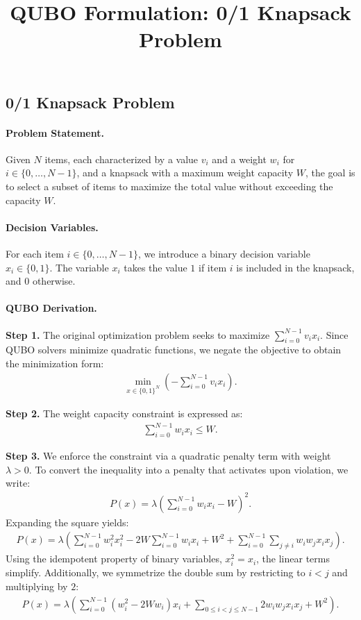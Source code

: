 \documentclass[12pt]{article}
\title{QUBO Formulation: 0/1 Knapsack Problem}
\date{}
\begin{document}
\maketitle

\subsection*{0/1 Knapsack Problem}

\paragraph{Problem Statement.}
Given $N$ items, each characterized by a value $v_i$ and a weight $w_i$ for $i \in \{0, \dots, N-1\}$, and a knapsack with a maximum weight capacity $W$, the goal is to select a subset of items to maximize the total value without exceeding the capacity $W$.

\paragraph{Decision Variables.}
For each item $i \in \{0, \dots, N-1\}$, we introduce a binary decision variable $x_i \in \{0, 1\}$. The variable $x_i$ takes the value $1$ if item $i$ is included in the knapsack, and $0$ otherwise.

\paragraph{QUBO Derivation.}
\textbf{Step 1.} The original optimization problem seeks to maximize $\sum_{i=0}^{N-1} v_i x_i$. Since QUBO solvers minimize quadratic functions, we negate the objective to obtain the minimization form:
\begin{align}
    \min_{x \in \{0,1\}^N} \left( -\sum_{i=0}^{N-1} v_i x_i \right).
\end{align}

\textbf{Step 2.} The weight capacity constraint is expressed as:
\begin{align}
    \sum_{i=0}^{N-1} w_i x_i \le W.
\end{align}

\textbf{Step 3.} We enforce the constraint via a quadratic penalty term with weight $\lambda > 0$. To convert the inequality into a penalty that activates upon violation, we write:
\begin{align}
    P(x) = \lambda \left( \sum_{i=0}^{N-1} w_i x_i - W \right)^2.
\end{align}
Expanding the square yields:
\begin{align}
    P(x) = \lambda \left( \sum_{i=0}^{N-1} w_i^2 x_i^2 - 2W \sum_{i=0}^{N-1} w_i x_i + W^2 + \sum_{i=0}^{N-1} \sum_{j \neq i} w_i w_j x_i x_j \right).
\end{align}
Using the idempotent property of binary variables, $x_i^2 = x_i$, the linear terms simplify. Additionally, we symmetrize the double sum by restricting to $i < j$ and multiplying by $2$:
\begin{align}
    P(x) = \lambda \left( \sum_{i=0}^{N-1} (w_i^2 - 2W w_i) x_i + \sum_{0 \le i < j \le N-1} 2 w_i w_j x_i x_j + W^2 \right).
\end{align}
\end{document}
